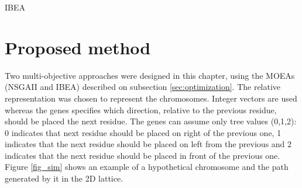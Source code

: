 \begin{algorithm}[htb!]
	\begin{algorithmic}[1]
	
	
		
		
		\EndWhile
	
	\EndWhile
	
	\end{algorithmic}
	\caption{IBEA}
	\label{alg:ibea}
\end{algorithm}




\section{Proposed method} \label{sec:proposedMethod}


Two multi-objective approaches were designed in this chapter, using the MOEAs (NSGAII and IBEA) described on subsection \ref{sec:optimization}. The relative representation was chosen to represent the chromosomes. Integer vectors are used whereas the genes specifies which direction, relative to the previous residue, should be placed the next residue. The genes can assume only tree values (0,1,2): 0 indicates that next residue should be placed on right of the previous one, 1 indicates that the next residue should be placed on left from the previous and 2 indicates that the next residue should be placed in front of the previous one. Figure \ref{fig_sim} shows an example of a hypothetical chromosome and the path generated by it in the 2D lattice.

